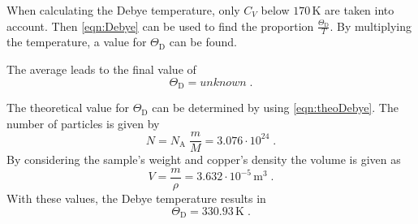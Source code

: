 When calculating the Debye temperature, only $C_{{V}}$ below $170\, \unit{\kelvin}$ are taken into account.
Then \autoref{eqn:Debye} can be used to find the proportion $\frac{\Theta_{\text{D}}}{T}$.
By multiplying the temperature, a value for $\Theta _{\text{D}}$ can be found.



The average leads to the final value of
\begin{equation*}
    \Theta _{\text{D}}= unknown     \; .
\end{equation*}

The theoretical value for $\Theta _{\text{D}}$ can be determined by using \autoref{eqn:theoDebye}.
The number of particles is given by 
\begin{equation*}
    N=N_{\text{A}}\; \frac{m}{M}=3.076 \cdot 10^{24}\; .
\end{equation*}
By considering the sample's weight and copper's density the volume is given as 
\begin{equation*}
    V=\frac{m}{\rho}=3.632 \cdot 10^{-5} \, \unit{\meter}^3\; .
\end{equation*}
With these values, the Debye temperature results in
\begin{equation*}
    \Theta_{\text{D}}=330.93\, \unit{\kelvin}\; .
\end{equation*}